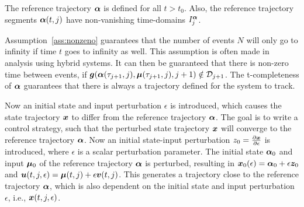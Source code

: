 \documentclass[../DC2017114Bouma.tex]{subfiles}
\begin{document}
\begin{myass}
The reference trajectory $\boldsymbol{\alpha}$ is defined for all $t>t_0$. Also, the reference trajectory segments $\boldsymbol{\alpha}(t,j)$ have non-vanishing time-domains $I^{\boldsymbol{\alpha}}_j$.\label{ass:nonzeno}
\end{myass}

Assumption~\ref{ass:nonzeno} guarantees that the number of events $N$ will only go to infinity if time $t$ goes to infinity as well. This assumption is often made in analysis using hybrid systems. It can then be guaranteed that there is non-zero time between events, if ${\boldsymbol{g}}(\boldsymbol{\alpha}(\tau_{j+1},j),\boldsymbol{\mu}(\tau_{j+1},j),j+1)\notin \mathcal{D}_{j+1}$. The t-completeness of $\boldsymbol{\alpha}$ guarantees that there is always a trajectory defined for the system to track.

Now an initial state and input perturbation $\epsilon$ is introduced, which causes the state trajectory ${\boldsymbol{x}}$ to differ from the reference trajectory $\boldsymbol{\alpha}$. The goal is to write a control strategy, such that the perturbed state trajectory ${\boldsymbol{x}}$ will converge to the reference trajectory $\boldsymbol{\alpha}$. Now an initial state-input perturbation $z_0 = \frac{\partial{\boldsymbol{x}}}{\partial\epsilon}$ is introduced, where $\epsilon$ is a scalar perturbation parameter. The initial state $\boldsymbol{\alpha}_0$ and input $\boldsymbol{\mu}_0$ of the reference trajectory $\boldsymbol{\alpha}$ is perturbed, resulting in ${\boldsymbol{x}}_0(\epsilon) = \boldsymbol{\alpha}_0 + \epsilon{\boldsymbol{z}}_0$ and ${\boldsymbol{u}}(t,j,\epsilon) = \boldsymbol{\mu}(t,j) + \epsilon{\boldsymbol{v}}(t,j)$. This generates a trajectory close to the reference trajectory $\boldsymbol{\alpha}$, which is also dependent on the initial state and input perturbation $\epsilon$, i.e., ${\boldsymbol{x}}(t,j,\epsilon)$. 
\end{document}
